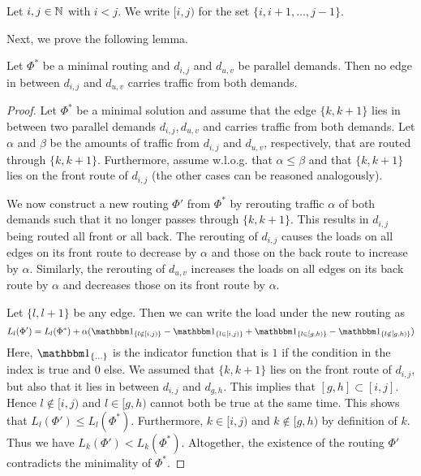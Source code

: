 

\begin{notation}
	Let $i, j \in \mathbb{N}$ with $i < j$.
	We write $[i, j)$ for the set $\{i, i+1, \ldots, j-1\}$.
\end{notation}

Next, we prove the following lemma.
\begin{lemma}
	\label{lemma:parallel-demands}
	Let $\Phi^\ast$ be a minimal routing and $d_{i, j}$ and $d_{u, v}$ be parallel demands.
	Then no edge in between $d_{i, j}$ and $d_{u, v}$ carries traffic from both demands.
\end{lemma}
\begin{proof}
	Let $\Phi^\ast$ be a minimal solution and assume that the edge $\{k, k+1\}$ lies in between two parallel demands $d_{i, j}, d_{u, v}$ and carries traffic from both demands.
	Let $\alpha$ and $\beta$ be the amounts of traffic from $d_{i,j}$ and $d_{u, v}$, respectively, that are routed through $\{k, k+1\}$.
	Furthermore, assume w.l.o.g. that $\alpha \leq \beta$ and that $\{k, k+1\}$ lies on the front route of $d_{i, j}$ (the other cases can be reasoned analogously).
	
	We now construct a new routing $\Phi'$ from $\Phi^\ast$ by rerouting traffic $\alpha$ of both demands such that it no longer passes through $\{k, k+1\}$.
	This results in $d_{i, j}$ being routed all front or all back.
	The rerouting of $d_{i, j}$ causes the loads on all edges on its front route to decrease by $\alpha$ and those on the back route to increase by $\alpha$.
	Similarly, the rerouting of $d_{u, v}$ increases the loads on all edges on its back route by $\alpha$ and decreases those on its front route by $\alpha$.
	
	Let $\{l, l+1\}$ be any edge.
	Then we can write the load under the new routing as
	\begin{equation}
	L_l(\Phi') = L_l(\Phi^\ast) 
	+ \alpha (\dOne_{\{l \notin [i, j)\}} - \dOne_{\{l \in [i, j)\}} +  \dOne_{\{l \in [g, h)\}} - \dOne_{\{l \notin [g, h)\}} )
	\end{equation}
	Here, $\dOne_{\{\ldots\}}$ is the indicator function that is $1$ if the condition in the index is true and $0$ else.
	We assumed that $\{k, k+1\}$ lies on the front route of $d_{i, j}$, but also that it lies in between $d_{i, j}$ and $d_{g, h}$.
	This implies that $[g, h] \subset [i, j]$.
	Hence $l \notin [i, j)$ and $l \in [g, h)$ cannot both be true at the same time.
	This shows that $L_l(\Phi') \leq L_l(\Phi^\ast)$.
	Furthermore, $k \in [i, j)$ and $k \notin [g, h)$ by definition of $k$.
	Thus we have $L_k(\Phi') < L_k(\Phi^\ast)$.
	Altogether, the existence of the routing $\Phi'$ contradicts the minimality of $\Phi^\ast$.
\end{proof}

